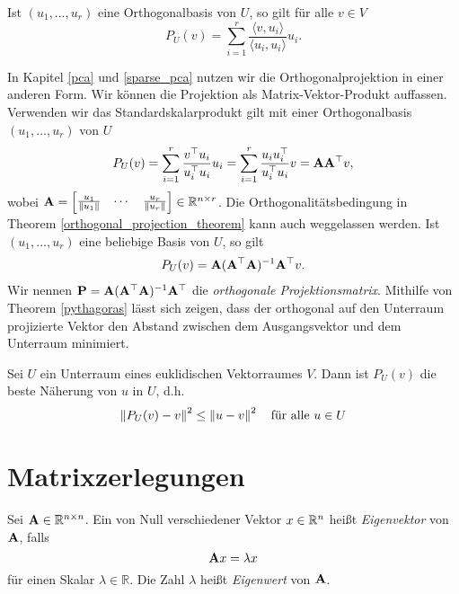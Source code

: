 \begin{thm}
\label{orthogonal_projection_theorem}
Ist $(u_1, \ldots, u_r)$ eine Orthogonalbasis von $U$, so gilt für alle $v \in V$
$$P_{U}(v) = \sum_{i=1}^r \frac{\langle v, u_i \rangle}{\langle u_i, u_i \rangle} u_i.$$
\end{thm}

In Kapitel \ref{pca} und \ref{sparse_pca} nutzen wir die Orthogonalprojektion in einer anderen Form. Wir können die Projektion als Matrix-Vektor-Produkt auffassen. Verwenden wir das Standardskalarprodukt gilt mit einer Orthogonalbasis $(u_1, \ldots, u_r)$ von $U$
\begin{align}
P_U(v) = \sum_{i=1}^r \frac{v^{\top} u_i}{u_i^{\top} u_i} u_i = \sum_{i=1}^r \frac{u_i u_i^{\top}}{u_i^{\top} u_i}v = \mathbf{A} \mathbf{A}^{\top} v,
\end{align}
wobei $\mathbf{A} = \begin{bmatrix} \frac{u_1}{\left\lVert u_1 \right\rVert} & \cdots & \frac{u_r}{\left\lVert u_r \right\rVert} \end{bmatrix} \in \mathbb{R}^{n \times r}$. Die Orthogonalitätsbedingung in Theorem \ref{orthogonal_projection_theorem} kann auch weggelassen werden. Ist $(u_{1},\ldots ,u_{r})$ eine beliebige Basis von $U$, so gilt
\begin{align}
P_U(v) = \mathbf{A} (\mathbf{A}^\top \mathbf{A})^{-1} \mathbf{A}^\top v.
\end{align}
Wir nennen $\mathbf{P} = \mathbf{A} (\mathbf{A}^\top \mathbf{A})^{-1} \mathbf{A}^\top$ die \textit{orthogonale Projektionsmatrix}. Mithilfe von Theorem \ref{pythagoras} lässt sich zeigen, dass der orthogonal auf den Unterraum projizierte Vektor den Abstand zwischen dem Ausgangsvektor und dem Unterraum minimiert.

\begin{thm}
Sei $U$ ein Unterraum eines euklidischen Vektorraumes $V$. Dann ist $P_U(v)$ die beste Näherung von $u$ in $U$, d.h.
$$\left\lVert P_U(v) - v \right\rVert^2 \leq \left\lVert u - v \right\rVert^2 \quad \text{für alle } u \in U$$
\end{thm}

\section{Matrixzerlegungen}
\label{matrix_decomposition}

\begin{defn}
Sei $\mathbf{A} \in \mathbb{R}^{n \times n}$. Ein von Null verschiedener Vektor $x \in \mathbb{R}^n$ heißt \textit{Eigenvektor} von $\mathbf{A}$, falls
$$\mathbf{A}x = \lambda x$$
für einen Skalar $\lambda \in \mathbb{R}$. Die Zahl $\lambda$ heißt \textit{Eigenwert} von $\mathbf{A}$.
\end{defn}

